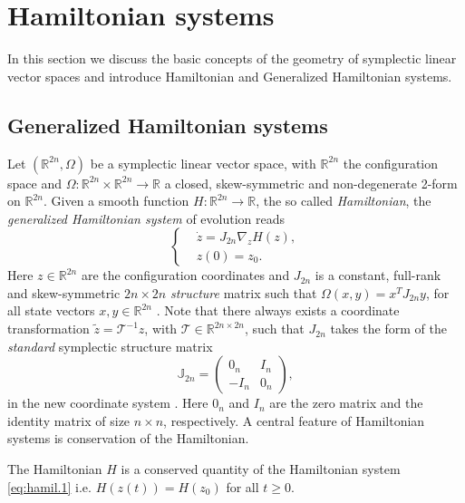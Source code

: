 \section{Hamiltonian systems}
\label{sec:hamil}

In this section we discuss the basic concepts of the geometry of symplectic linear vector spaces and introduce Hamiltonian and Generalized Hamiltonian systems.

\subsection{Generalized Hamiltonian systems}
\label{sec:hamil.1}

Let $(\mathbb R^{2n}, \Omega)$ be a symplectic linear vector space, with $\mathbb R^{2n}$ the configuration space and $\Omega:\mathbb R^{2n}\times\mathbb R^{2n} \to \mathbb R$ a closed, skew-symmetric and non-degenerate 2-form on $\mathbb R^{2n}$. Given a smooth function $H:\mathbb R^{2n} \to \mathbb R$, the so called \emph{Hamiltonian}, the \emph{generalized Hamiltonian system} of evolution reads
\begin{equation} \label{eq:hamil.1}
\left\{
\begin{aligned}
	& \dot z = J_{2n} \nabla_z H(z),  \\
	&  z(0) = z_0.
\end{aligned}
\right.
\end{equation}
Here $z\in \mathbb R^{2n}$ are the configuration coordinates and $J_{2n}$ is a constant, full-rank and skew-symmetric $2n\times 2n$ \emph{structure} matrix such that $\Omega(x,y) = x^TJ_{2n}y$, for all state vectors $x,y\in \mathbb R^{2n}$ \cite{Marsden:2010:IMS:1965128}. Note that there always exists a coordinate transformation $\tilde z = \mathcal T^{-1} z$, with $\mathcal T \in \mathbb R^{2n\times 2n}$, such that $J_{2n}$ takes the form of the \emph{standard} symplectic structure matrix
\begin{equation} \label{eq:hamil.2}
	\mathbb{J}_{2n} = 
	\begin{pmatrix}
	0_n & I_n \\
	-I_n & 0_n
	\end{pmatrix},
\end{equation}
in the new coordinate system \cite{de2006symplectic}.
Here $0_n$ and $I_n$ are the zero matrix and the identity matrix of size $n\times n$, respectively. A central feature of Hamiltonian systems is conservation of the Hamiltonian.

\begin{theorem} \label{thm:1}
\cite{Marsden:2010:IMS:1965128} The Hamiltonian $H$ is a conserved quantity of the Hamiltonian system \eqref{eq:hamil.1} i.e. $H(z(t)) = H(z_0)$ for all $t \geq 0$.
\end{theorem}

